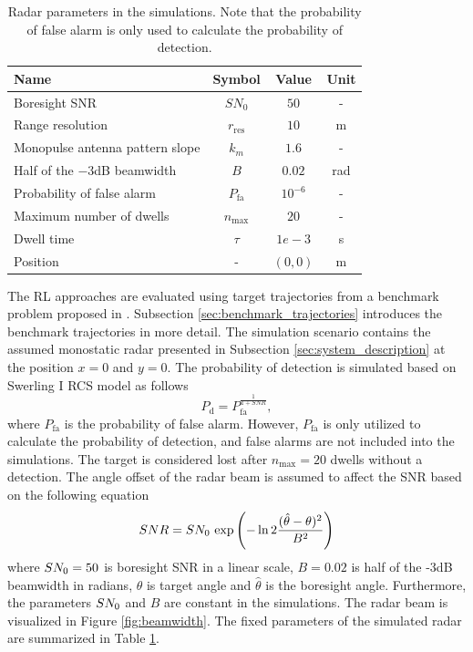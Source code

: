 \documentclass[english, 12pt, a4paper, elec, utf8, a-1b, online]{aaltothesis}
\renewcommand{\exp}[1]{\text{exp}\left( #1 \right)}
\newcommand{\nmax}{n_\text{max}}
\begin{document}
\bgroup
\def \arraystretch{1.25}
\begin{table}[tb]
    \centering
    \begin{tabular}{|l|c|c|c|}
    \hline
    \textbf{Name}              & \textbf{Symbol} & \textbf{Value}  & \textbf{Unit}\\ \hline
    Boresight SNR              & $SN_0$          & $50$ & -          \\ \hline
    Range resolution            & $r_\text{res}$  & $10$ & m  \\ \hline
    Monopulse antenna pattern slope  & $k_m$      & $1.6$ & -  \\ \hline
    Half of the $-3$dB beamwidth & $B$             & $0.02$ & rad         \\ \hline
    Probability of false alarm & $P_\text{fa}$   & $10^{-6}$ & -      \\ \hline
    Maximum number of dwells   & $n_\text{max}$  & $20$ & -  \\ \hline
    Dwell time                 & $\tau$          & $1e-3$ & s   \\ \hline
    Position                   & -               & $(0, 0)$ & m \\ \hline
    \end{tabular}
    \caption{Radar parameters in the simulations. Note that the probability of false alarm is only used to calculate the probability of detection.}
    \label{tab:radar_parameters}
\end{table}
\egroup

The RL approaches are evaluated using target trajectories from a benchmark problem proposed in \cite{Blair1998}. 
Subsection \ref{sec:benchmark_trajectories} introduces the benchmark trajectories in more detail. 
The simulation scenario contains the assumed monostatic radar presented in Subsection \ref{sec:system_description} at the position $x=0$ and $y=0$. 
The probability of detection is simulated based on Swerling I RCS model as follows
\begin{equation}\label{eq:singer_1_pd}
    P_\text{d} = P_\text{fa}^{\frac{1}{1+SNR}},
\end{equation}
where $P_\text{fa}$ is the probability of false alarm.
However, $P_\text{fa}$ is only utilized to calculate the probability of detection, and false alarms are not included into the simulations.
The target is considered lost after $\nmax=20$ dwells without a detection.
The angle offset of the radar beam is assumed to affect the SNR based on the following equation
\begin{equation} \label{eq:offset_snr}
    SNR = \sno~\exp{ - \ln{2}
        \frac
            {(\hat{\theta} - \theta)^2}
            {B^2}}    
\end{equation}
where $SN_0=50$ is boresight SNR in a linear scale, $B=0.02$ is half of the -3dB beamwidth in radians, $\theta$ is target angle and $\hat{\theta} $ is the boresight angle. 
Furthermore, the parameters $SN_0$ and $B$ are constant in the simulations. 
The radar beam is visualized in Figure \ref{fig:beamwidth}.
The fixed parameters of the simulated radar are summarized in Table \ref{tab:radar_parameters}.
\end{document}
